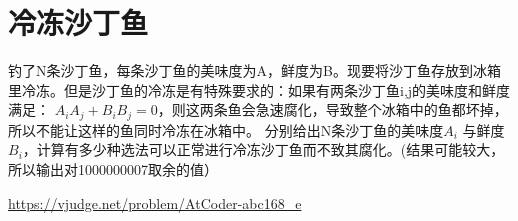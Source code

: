 \section{冷冻沙丁鱼}

钓了N条沙丁鱼，每条沙丁鱼的美味度为A，鲜度为B。现要将沙丁鱼存放到冰箱里冷冻。但是沙丁鱼的冷冻是有特殊要求的：如果有两条沙丁鱼i,j的美味度和鲜度满足： \(A_iA_j+B_iB_j=0 \)，则这两条鱼会急速腐化，导致整个冰箱中的鱼都坏掉，所以不能让这样的鱼同时冷冻在冰箱中。
分别给出N条沙丁鱼的美味度\(A_i\) 与鲜度 \(B_i\)，计算有多少种选法可以正常进行冷冻沙丁鱼而不致其腐化。(结果可能较大，所以输出对1000000007取余的值） 

\url{https://vjudge.net/problem/AtCoder-abc168_e}


